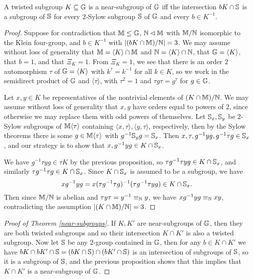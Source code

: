 \documentclass[letterpaper,11pt]{article}
\begin{document}
\begin{prop} A twisted subgroup $K \subseteq \mathbb{G}$ is a near-subgroup of $\mathbb{G}$ iff the intersection $bK \cap \mathbb{S}$ is a subgroup of $\mathbb{S}$ for every $2$-Sylow subgroup $\mathbb{S}$ of $\mathbb{G}$ and every $b \in K^{-1}$.
\end{prop}
\begin{proof} Suppose for contradiction that $\mathbb{M} \le \mathbb{G}$, $\mathbb{N}\lhd \mathbb{M}$ with $\mathbb{M}/\mathbb{N}$ isomorphic to the Klein four-group, and $b \in K^{-1}$ with $|(bK \cap \mathbb{M})/\mathbb{N}| = 3$. We may assume without loss of generality that $\mathbb{M} = \langle K\rangle \cap \mathbb{M}$ and $\mathbb{N} = \langle K\rangle \cap \mathbb{N}$, that $\mathbb{G} = \langle K\rangle$, that $b = 1$, and that $\Xi_K = 1$. From $\Xi_K = 1$, we see that there is an order $2$ automorphism $\tau$ of $\mathbb{G} = \langle K\rangle$ with $k^\tau = k^{-1}$ for all $k \in K$, so we work in the semidirect product of $\mathbb{G}$ and $\langle \tau \rangle$, with $\tau^2 = 1$ and $\tau g\tau = g^\tau$ for $g \in \mathbb{G}$.

Let $x,y \in K$ be representatives of the nontrivial elements of $(K \cap \mathbb{M})/\mathbb{N}$. We may assume without loss of generality that $x,y$ have orders equal to powers of $2$, since otherwise we may replace them with odd powers of themselves. Let $\mathbb{S}_x,\mathbb{S}_y$ be $2$-Sylow subgroups of $\mathbb{M}\langle\tau\rangle$ containing $\langle x,\tau\rangle,\langle y,\tau\rangle$, respectively, then by the Sylow theorems there is some $g \in \mathbb{M}\langle\tau\rangle$ with $g^{-1}\mathbb{S}_yg = \mathbb{S}_x$. Then $x,\tau,g^{-1}yg,g^{-1}\tau g \in \mathbb{S}_x$, and our strategy is to show that $x,g^{-1}yg \in K\cap \mathbb{S}_x$.

We have $g^{-1}\tau yg \in \tau K$ by the previous proposition, so $\tau g^{-1}\tau y g \in K \cap \mathbb{S}_x$, and similarly $\tau g^{-1}\tau g \in K\cap \mathbb{S}_x$. Since $K\cap \mathbb{S}_x$ is assumed to be a subgroup, we have
\[
xg^{-1}yg = x(\tau g^{-1} \tau g)^{-1} (\tau g^{-1} \tau yg) \in K\cap \mathbb{S}_x.
\]
Then since $\mathbb{M}/\mathbb{N}$ is abelian and $\tau y\tau = y^{-1} \equiv_{\mathbb{N}} y$, we have $xg^{-1}yg \equiv_{\mathbb{N}} xy$, contradicting the assumption $|(K\cap \mathbb{M})/\mathbb{N}| = 3$.
\end{proof}

\begin{proof}[Proof of Theorem \ref{near-subgroups}] If $K,K'$ are near-subgroups of $\mathbb{G}$, then they are both twisted subgroups and so their intersection $K \cap K'$ is also a twisted subgroup. Now let $\mathbb{S}$ be any $2$-group contained in $\mathbb{G}$, then for any $b \in K\cap K'$ we have $bK\cap bK' \cap \mathbb{S} = (bK \cap \mathbb{S}) \cap (bK' \cap \mathbb{S})$ is an intersection of subgroups of $\mathbb{S}$, so it is a subgroup of $\mathbb{S}$, and the previous proposition shows that this implies that $K\cap K'$ is a near-subgroup of $\mathbb{G}$.
\end{proof}
\end{document}
